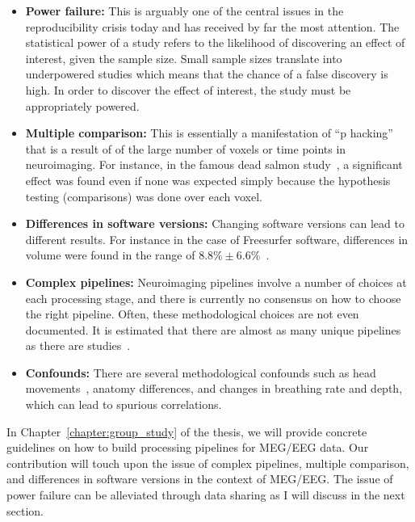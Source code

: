 \begin{itemize}[noitemsep,partopsep=0pt]
\item \textbf{Power failure:} This is arguably one of the central issues in the reproducibility crisis today and has received by far the most attention. The statistical power of a study refers to the likelihood of discovering an effect of interest, given the sample size. Small sample sizes translate into underpowered studies which means that the chance of a false discovery is high. In order to discover the effect of interest, the study must be appropriately powered.
\item \textbf{Multiple comparison:} This is essentially a manifestation of ``p hacking'' that is a result of of the large number of voxels or time points in neuroimaging. For instance, in the famous dead salmon study~\citep{bennett2009neural}, a significant effect was found even if none was expected simply because the hypothesis testing (comparisons) was done over each voxel.
\item \textbf{Differences in software versions:} Changing software versions can lead to different results. For instance in the case of Freesurfer software, differences in volume were found in the range of $8.8\% \pm 6.6\%$~\citep{gronenschild2012effects}.
\item \textbf{Complex pipelines:} Neuroimaging pipelines involve a number of choices at each processing stage, and there is currently no consensus on how to choose the right pipeline. Often, these methodological choices are not even documented. It is estimated that there are almost as many unique pipelines as there are studies~\citep{Carp2012289}.
\item \textbf{Confounds:} There are several methodological confounds such as head movements~\citep{yendiki2014spurious}, anatomy differences, and changes in breathing rate and depth, which can lead to spurious correlations.
\end{itemize}

In Chapter~\ref{chapter:group_study} of the thesis, we will provide concrete guidelines on how to build processing pipelines for \ac{MEG}/\ac{EEG} data. Our contribution will touch upon the issue of complex pipelines, multiple comparison, and differences in software versions in the context of \ac{MEG}/\ac{EEG}. The issue of power failure can be alleviated through data sharing as I will discuss in the next section.

